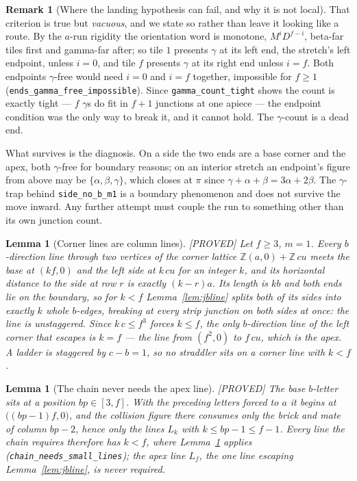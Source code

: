 \documentclass[11pt,reqno]{amsart}
\theoremstyle{plain}
\newtheorem{lemma}[theorem]{Lemma}
\theoremstyle{definition}
\newtheorem{remark}[theorem]{Remark}
\newcommand{\lab}[1]{\hfill\textnormal{\footnotesize\textsc{[#1]}}}
\begin{document}
\begin{remark}[Where the landing hypothesis can fail, and why it is not local]
That criterion is true but \emph{vacuous}, and we state so rather than leave it looking like a
route. By the $a$-run rigidity the orientation word is monotone, $M^iD^{f-i}$, beta-far tiles first
and gamma-far after; so tile $1$ presents $\gamma$ at its left end, the stretch's left endpoint,
unless $i=0$, and tile $f$ presents $\gamma$ at its right end unless $i=f$. Both endpoints
$\gamma$-free would need $i=0$ and $i=f$ together, impossible for $f\ge1$
(\texttt{ends\_gamma\_free\_impossible}). Since \texttt{gamma\_count\_tight} shows the count is
exactly tight --- $f$ $\gamma$s do fit in $f+1$ junctions at one apiece --- the endpoint condition
was the only way to break it, and it cannot hold. The $\gamma$-count is a dead end.

What survives is the diagnosis. On a side the two ends are a base corner and the apex, both
$\gamma$-free for boundary reasons; on an interior stretch an endpoint's figure from above may be
$\{\alpha,\beta,\gamma\}$, which closes at $\pi$ since $\gamma+\alpha+\beta=3\alpha+2\beta$.
The $\gamma$-trap behind \texttt{side\_no\_b\_m1} is a boundary phenomenon and does not survive
the move inward. Any further attempt must couple the run to something other than its own junction
count.
\end{remark}

\begin{lemma}[Corner lines are column lines]\label{lem:columnlines}\lab{PROVED}
Let $f\ge3$, $m=1$. Every $b$-direction line through two vertices of the corner lattice
$\mathbb Z(a,0)+\mathbb Z\,cu$ meets the base at $(kf,0)$ and the left side at $k\,cu$ for an
integer $k$, and its horizontal distance to the side at row $r$ is exactly $(k-r)a$. Its length is
$kb$ and both ends lie on the boundary, so for $k<f$ Lemma~\ref{lem:jbline} splits both of its
sides into exactly $k$ whole $b$-edges, breaking at every strip junction on both sides at once:
the line is \emph{unstaggered}. Since $k\,c\le f^3$ forces $k\le f$, the only $b$-direction line
of the left corner that escapes is $k=f$ --- the line from $(f^2,0)$ to $f\,cu$, which is the
apex. A ladder is staggered by $c-b=1$, so no straddler sits on a corner line with $k<f$.
\end{lemma}

\begin{lemma}[The chain never needs the apex line]\label{lem:noapexline}\lab{PROVED}
The base $b$-letter sits at a position $bp\in[3,f]$. With the preceding letters forced to $a$ it
begins at $\bigl((bp-1)f,0\bigr)$, and the collision figure there consumes only the brick and
mate of column $bp-2$, hence only the lines $L_k$ with $k\le bp-1\le f-1$. Every line the chain
requires therefore has $k<f$, where Lemma~\ref{lem:columnlines} applies
(\texttt{chain\_needs\_small\_lines}); the apex line $L_f$, the one line escaping
Lemma~\ref{lem:jbline}, is never required.
\end{lemma}
\end{document}
